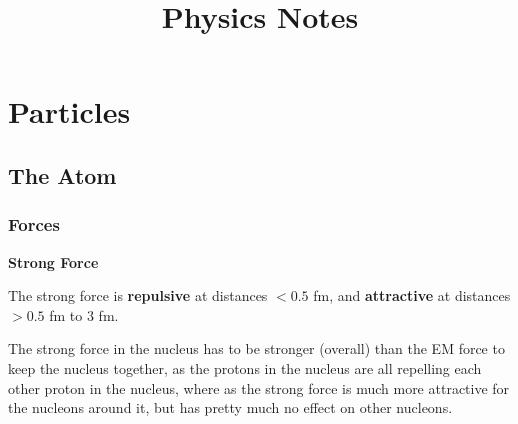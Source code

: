 \documentclass[a4paper]{article}
\title{Physics Notes}
\date{}
\begin{document}
\maketitle

\setcounter{secnumdepth}{0}
\section{Particles}

\subsection{The Atom}
\subsubsection{Forces}

\textbf{Strong Force}

The strong force is {\textbf{repulsive}} at distances $< 0.5$ fm, and {\textbf{attractive}} at distances $> 0.5$ fm to $3$ fm.

The strong force in the nucleus has to be stronger (overall) than the EM force to keep the nucleus together, as the protons in the nucleus are all repelling each other proton in the nucleus, where as the strong force is much more attractive for the nucleons around it, but has pretty much no effect on other nucleons.
\end{document}

